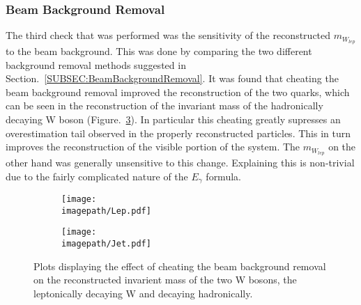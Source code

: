 \subsubsection{Beam Background Removal}
\label{SUBSUBSEC:BeamBackground}
The third check that was performed was the sensitivity of the reconstructed ${m}_{W_{lep}}$  to the beam background. This was done by comparing the two different background removal methods suggested in Section.~\ref{SUBSEC:BeamBackgroundRemoval}. It was found that cheating the beam background removal improved the reconstruction of the two quarks, which can be seen in the reconstruction of the invariant mass of the hadronically decaying W boson (Figure.~\ref{FIG:Cheat}). In particular this cheating greatly supresses an overestimation tail observed in the properly reconstructed particles. This in turn improves the reconstruction of the visible portion of the system. The ${m}_{W_{lep}}$ on the other hand was generally unsensitive to this change. Explaining this is non-trivial due to the fairly complicated nature of the $E_{\gamma}$ formula.
\begin{figure}
    \begin{subfigure}[t]{0.45\textwidth}
      \centering
      \texttt{[image: \\imagepath/Lep.pdf]}
      \caption{}
      \label{SUBFIG:CheatLep}
    \end{subfigure}
    \begin{subfigure}[t]{0.45\textwidth}
      \centering
      \texttt{[image: \\imagepath/Jet.pdf]}
      \caption{}
      \label{SUBFIG:CheatHad}
    \end{subfigure}
    \caption{
        Plots displaying the effect of cheating the beam background removal on the reconstructed invarient mass of the two W bosons,
         the leptonically decaying W and  decaying hadronically.
      }
    \label{FIG:Cheat}
\end{figure}

